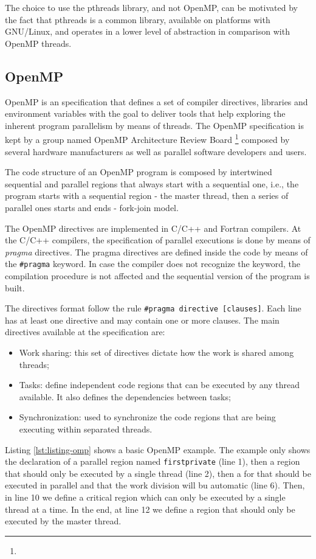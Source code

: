 The choice to use the pthreads library, and not OpenMP, can be motivated by the
fact that pthreads is a common library, available on platforms with GNU/Linux,
and operates in a lower level of abstraction in comparison with OpenMP threads.

\subsection{OpenMP}

OpenMP is an specification that defines a set of compiler directives, libraries
and environment variables with the goal to deliver tools that help exploring
the inherent program parallelism by means of threads. The OpenMP specification
is kept by a group named OpenMP Architecture Review Board \footnote{} composed
by several hardware manufacturers as well as parallel software developers and
users.

The code structure of an OpenMP program is composed by intertwined sequential
and parallel regions that always start with a sequential one, i.e., the program
starts with a sequential region - the master thread, then a series of parallel
ones starts and ends - fork-join model.

The OpenMP directives are implemented in C/C++ and Fortran compilers. At the
C/C++ compilers, the specification of parallel executions is done by means of
\textit{pragma} directives. The pragma directives are defined inside the code
by means of the \texttt{\#pragma} keyword. In case the compiler does not
recognize the keyword, the compilation procedure is not affected and the
sequential version of the program is built.

The directives format follow the rule \texttt{\#pragma directive [clauses]}.
Each line has at least one directive and may contain one or more clauses. The
main directives available at the specification are: 
\begin{itemize}
    \item Work sharing: this set of directives dictate how the work is shared
    among threads;
    \item Tasks: define independent code regions that can be executed by any
    thread available. It also defines the dependencies between tasks;
    \item Synchronization: used to synchronize the code regions that are being
    executing within separated threads.
\end{itemize}

Listing \ref{lst:listing-omp} shows a basic OpenMP example. The example only
shows the declaration of a parallel region named \texttt{firstprivate} (line
1), then a region that should only be executed by a single thread (line 2),
then a for that should be executed in parallel and that the work division will
bu automatic (line 6). Then, in line 10 we define a critical region which can
only be executed by a single thread at a time. In the end, at line 12 we define
a region that should only be executed by the master thread.


